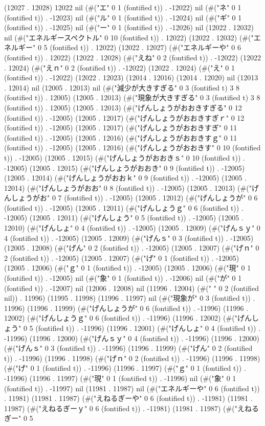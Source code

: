 (12027 . 12028) 12022 nil (#("エ" 0 1 (fontified t)) . -12022) nil (#("ネ" 0 1 (fontified t)) . -12023) nil (#("ル" 0 1 (fontified t)) . -12024) nil (#("ギ" 0 1 (fontified t)) . -12025) nil (#("ー" 0 1 (fontified t)) . -12026) nil (12022 . 12032) nil (#("エネルギースペクトル" 0 10 (fontified t)) . 12022) (12022 . 12032) (#("エネルギー" 0 5 (fontified t)) . 12022) (12022 . 12027) (#("エネルギーや" 0 6 (fontified t)) . 12022) (12022 . 12028) (#("えね" 0 2 (fontified t)) . -12022) (12022 . 12024) (#("えｎ" 0 2 (fontified t)) . -12022) (12022 . 12024) (#("え" 0 1 (fontified t)) . -12022) (12022 . 12023) (12014 . 12016) (12014 . 12020) nil (12013 . 12014) nil (12005 . 12013) nil (#("減少が大きすぎる" 0 3 (fontified t) 3 8 (fontified t)) . 12005) (12005 . 12013) (#("現象が大きすぎる" 0 3 (fontified t) 3 8 (fontified t)) . 12005) (12005 . 12013) (#("げんしょうがおおきすぎる" 0 12 (fontified t)) . -12005) (12005 . 12017) (#("げんしょうがおおきすぎｒ" 0 12 (fontified t)) . -12005) (12005 . 12017) (#("げんしょうがおおきすぎ" 0 11 (fontified t)) . -12005) (12005 . 12016) (#("げんしょうがおおきすｇ" 0 11 (fontified t)) . -12005) (12005 . 12016) (#("げんしょうがおおきす" 0 10 (fontified t)) . -12005) (12005 . 12015) (#("げんしょうがおおきｓ" 0 10 (fontified t)) . -12005) (12005 . 12015) (#("げんしょうがおおき" 0 9 (fontified t)) . -12005) (12005 . 12014) (#("げんしょうがおおｋ" 0 9 (fontified t)) . -12005) (12005 . 12014) (#("げんしょうがおお" 0 8 (fontified t)) . -12005) (12005 . 12013) (#("げんしょうがお" 0 7 (fontified t)) . -12005) (12005 . 12012) (#("げんしょうが" 0 6 (fontified t)) . -12005) (12005 . 12011) (#("げんしょうｇ" 0 6 (fontified t)) . -12005) (12005 . 12011) (#("げんしょう" 0 5 (fontified t)) . -12005) (12005 . 12010) (#("げんしょ" 0 4 (fontified t)) . -12005) (12005 . 12009) (#("げんｓｙ" 0 4 (fontified t)) . -12005) (12005 . 12009) (#("げんｓ" 0 3 (fontified t)) . -12005) (12005 . 12008) (#("げん" 0 2 (fontified t)) . -12005) (12005 . 12007) (#("げｎ" 0 2 (fontified t)) . -12005) (12005 . 12007) (#("げ" 0 1 (fontified t)) . -12005) (12005 . 12006) (#("ｇ" 0 1 (fontified t)) . -12005) (12005 . 12006) (#("現" 0 1 (fontified t)) . -12005) nil (#("象" 0 1 (fontified t)) . -12006) nil (#("が" 0 1 (fontified t)) . -12007) nil (12006 . 12008) nil (11996 . 12004) (#("	 " 0 2 (fontified nil)) . 11996) (11995 . 11998) (11996 . 11997) nil (#("現象が" 0 3 (fontified t)) . 11996) (11996 . 11999) (#("げんしょうが" 0 6 (fontified t)) . -11996) (11996 . 12002) (#("げんしょうｇ" 0 6 (fontified t)) . -11996) (11996 . 12002) (#("げんしょう" 0 5 (fontified t)) . -11996) (11996 . 12001) (#("げんしょ" 0 4 (fontified t)) . -11996) (11996 . 12000) (#("げんｓｙ" 0 4 (fontified t)) . -11996) (11996 . 12000) (#("げんｓ" 0 3 (fontified t)) . -11996) (11996 . 11999) (#("げん" 0 2 (fontified t)) . -11996) (11996 . 11998) (#("げｎ" 0 2 (fontified t)) . -11996) (11996 . 11998) (#("げ" 0 1 (fontified t)) . -11996) (11996 . 11997) (#("ｇ" 0 1 (fontified t)) . -11996) (11996 . 11997) (#("現" 0 1 (fontified t)) . -11996) nil (#("象" 0 1 (fontified t)) . -11997) nil (11981 . 11987) nil (#("エネルギーや" 0 6 (fontified t)) . 11981) (11981 . 11987) (#("えねるぎーや" 0 6 (fontified t)) . -11981) (11981 . 11987) (#("えねるぎーｙ" 0 6 (fontified t)) . -11981) (11981 . 11987) (#("えねるぎー" 0 5 